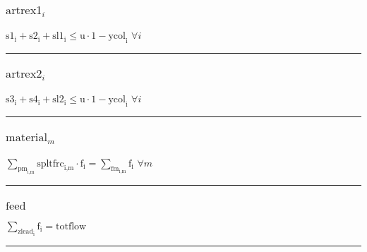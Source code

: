 \documentclass[11pt]{article}
\begin{document}
\subsubsection*{\begin{math}\text{artrex1}_{i}\end{math}}
\begin{math}
\text{s1}_{\text{i}} + \text{s2}_{\text{i}} + \text{sl1}_{\text{i}} \leq \text{u} \cdot 1 - \text{ycol}_{\text{i}}
\end{math}
\hfill
\begin{math}
\forall i
\end{math}\vspace{5pt}
\hrule
\subsubsection*{\begin{math}\text{artrex2}_{i}\end{math}}
\begin{math}
\text{s3}_{\text{i}} + \text{s4}_{\text{i}} + \text{sl2}_{\text{i}} \leq \text{u} \cdot 1 - \text{ycol}_{\text{i}}
\end{math}
\hfill
\begin{math}
\forall i
\end{math}\vspace{5pt}
\hrule
\subsubsection*{\begin{math}\text{material}_{m}\end{math}}
\begin{math}
\displaystyle \sum_{\text{pm}_{\text{i},\text{m}}} \text{spltfrc}_{\text{i},\text{m}} \cdot \text{f}_{\text{i}} = \displaystyle \sum_{\text{fm}_{\text{i},\text{m}}} \text{f}_{\text{i}}
\end{math}
\hfill
\begin{math}
\forall m
\end{math}\vspace{5pt}
\hrule
\subsubsection*{\begin{math}\text{feed}\end{math}}
\begin{math}
\displaystyle \sum_{\text{zlead}_{\text{i}}} \text{f}_{\text{i}} = \text{totflow}
\end{math}
\vspace{5pt}
\hrule
\end{document}
